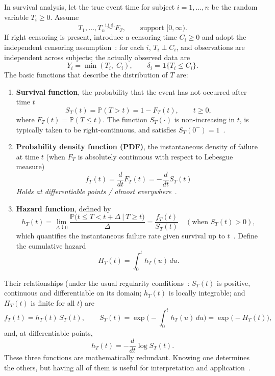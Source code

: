 In survival analysis, let the true event time for subject $i=1,\dots,n$ be the random variable $T_i\ge 0$. Assume
$$
T_1,\ldots,T_n \stackrel{\text{i.i.d.}}{\sim} F_T,\qquad \text{support }[0,\infty).
$$
If right censoring is present, introduce a censoring time $C_i\ge 0$ and adopt the independent censoring assumption~\cite{kalbfleisch2002statistical}: for each $i$, $T_i\perp C_i$, and observations are independent across subjects; the actually observed data are
$$
Y_i=\min(T_i,\;C_i),\qquad \delta_i=\mathbf 1\{T_i\le C_i\}.
$$
The basic functions that describe the distribution of $T$ are:
\begin{enumerate}
    \item \textbf{Survival function}, the probability that the event has not occurred after time $t$
   \begin{equation}
       S_T(t)=\mathbb P(T>t)=1-F_T(t),\qquad t\ge 0,
   \end{equation}
   where $F_T(t)=\mathbb P(T\le t)$. The function $S_T(\cdot)$ is non-increasing in $t$, is typically taken to be right-continuous, and satisfies $S_T(0^-)=1$~\cite{ibrahim2013bayesian}.
   \item \textbf{Probability density function (PDF)}, the instantaneous density of failure at time $t$ (when $F_T$ is absolutely continuous with respect to Lebesgue measure)
   \begin{equation}
   f_T(t)=\frac{d}{dt}F_T(t)=-\frac{d}{dt}S_T(t)
  \end{equation}
\noindent\textit{Holds at differentiable points / almost everywhere}~\cite{ibrahim2013bayesian,kleinbaum1996survival}.
   \item \textbf{Hazard function}, defined by
   \begin{equation}
        h_T(t)=\lim_{\Delta\downarrow 0}\frac{\mathbb P\big(t\le T<t+\Delta\ \big|\ T\ge t\big)}{\Delta}
          =\frac{f_T(t)}{S_T(t)}\quad(\text{when }S_T(t)>0),
   \end{equation}
   which quantifies the instantaneous failure rate given survival up to $t$~\cite{kalbfleisch2002statistical, ibrahim2013bayesian}. Define the cumulative hazard \begin{equation}
       H_T(t)=\int_0^{t} h_T(u)\,du.
   \end{equation}
\end{enumerate}

Their relationships (under the usual regularity conditions~\cite{kleinbaum1996survival}: $S_T(t)$ is positive, continuous and differentiable on its domain; $h_T(t)$ is locally integrable; and $H_T(t)$ is finite for all $t$) are
\begin{equation}
    f_T(t)=h_T(t)\,S_T(t),\qquad
S_T(t)=\exp\!\Big(-\!\int_0^{t} h_T(u)\,du\Big)=\exp\!\big(-H_T(t)\big),
\label{eq:4}
\end{equation}
and, at differentiable points,
\begin{equation}
    h_T(t)=-\frac{d}{dt}\log S_T(t).
\end{equation}
These three functions are mathematically redundant. Knowing one determines the others, but having all of them is useful for interpretation and application~\cite{kalbfleisch2002statistical}.





